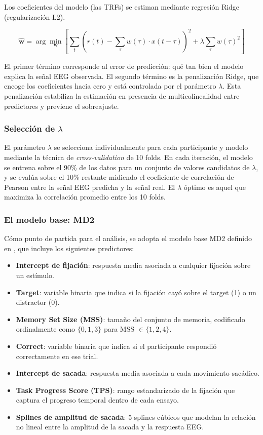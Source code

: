 Los coeficientes del modelo (las TRFs) se estiman mediante regresión Ridge (regularización L2).

\begin{equation}
\hat{\mathbf{w}} = \arg\min_{\mathbf{w}} \left[ \sum_t \left( r(t) - \sum_{\tau} w(\tau) \cdot x(t-\tau) \right)^2 + \lambda \sum_{\tau} w(\tau)^2 \right]
\end{equation}

El primer término corresponde al error de predicción: qué tan bien el modelo explica la señal EEG observada. El segundo término es la penalización Ridge, que encoge los coeficientes hacia cero y está controlada por el parámetro $\lambda$. Esta penalización estabiliza la estimación en presencia de multicolinealidad entre predictores y previene el sobreajuste.

\subsubsection{Selección de $\lambda$}

El parámetro $\lambda$ se selecciona individualmente para cada participante y modelo mediante la técnica de \textit{cross-validation} de 10 folds. En cada iteración, el modelo se entrena sobre el 90\% de los datos para un conjunto de valores candidatos 
de $\lambda$, y se evalúa sobre el 10\% restante midiendo el coeficiente de correlación 
de Pearson entre la señal EEG predicha y la señal real. El $\lambda$ óptimo es aquel 
que maximiza la correlación promedio entre los 10 folds.

\subsubsection{El modelo base: MD2}

Cómo punto de partida para el análisis, se adopta el modelo base MD2 definido en \citet{care2025}, que incluye los siguientes predictores:

\begin{itemize}
    \item \textbf{Intercept de fijación}: respuesta media asociada a cualquier
    fijación sobre un estímulo.
    \item \textbf{Target}: variable binaria que indica si la fijación cayó sobre 
    el target (1) o un distractor (0).
    \item \textbf{Memory Set Size (MSS)}: tamaño del conjunto de memoria, 
    codificado ordinalmente como $\{0, 1, 3\}$ para MSS $\in \{1, 2, 4\}$.
    \item \textbf{Correct}: variable binaria que indica si el participante 
    respondió correctamente en ese trial.
    \item \textbf{Intercept de sacada}: respuesta media asociada a cada 
    movimiento sacádico.
    \item \textbf{Task Progress Score (TPS)}: rango estandarizado de la fijación que captura el progreso temporal dentro de cada ensayo.
    \item \textbf{Splines de amplitud de sacada}: 5 splines cúbicos que 
    modelan la relación no lineal entre la amplitud de la sacada y la 
    respuesta EEG.
\end{itemize}

